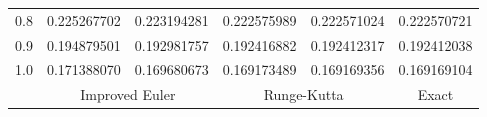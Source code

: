 \begin{examplesolution}
\begin{newtable}
\begin{center}
\begin{tabular}{|c|r|r|r|r|r|}
      0.8                       & 0.225267702                         & 0.223194281                      & 0.222575989                   & 0.222571024                    & 0.222570721                 \\
      0.9                       & 0.194879501                         & 0.192981757                      & 0.192416882                   & 0.192412317                    & 0.192412038                 \\
      1.0                       & 0.171388070                         & 0.169680673                      & 0.169173489                   & 0.169169356                    & 0.169169104                 \\
      \hline
                                & \multicolumn{2}{c|}{Improved Euler} & \multicolumn{2}{c|}{Runge-Kutta} & \multicolumn{1}{c|}{Exact}     \\
      \hline
    \end{tabular}
  \end{center}
\end{newtable}
\end{examplesolution}

